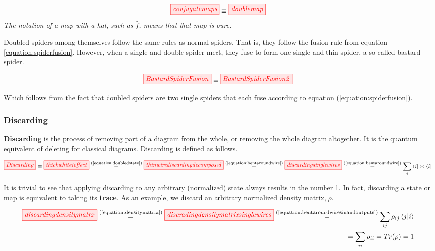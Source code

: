 \documentclass[]{article}
\newcommand{\equaltext}[1]{\ensuremath{\stackrel{\text{#1}}{=}}}
\begin{document}
\begin{equation}
\label{equation:conjugatemaps}
\tikzfig{conjugatemaps} \equiv \tikzfig{doublemap}
\end{equation}
\textit{The notation of a map with a hat, such as $\hat{f}$, means that that map is pure.}

Doubled spiders among themselves follow the same rules as normal spiders. That is, they follow the fusion rule from equation \ref{equation:spiderfusion}. However, when a single and double spider meet, they fuse to form one single and thin spider, a so called bastard spider.

\begin{equation}
\label{equation:bastardspiderfusion}
	\tikzfig{BastardSpiderFusion} = \tikzfig{BastardSpiderFusion2}
\end{equation}

Which follows from the fact that doubled spiders are two single spiders that each fuse according to equation (\ref{equation:spiderfusion}).
\subsubsection{Discarding}
\label{discarding}

\textbf{Discarding} is the process of removing part of a diagram from the whole, or removing the whole diagram altogether. It is the quantum equivalent of deleting for classical diagrams. Discarding is defined as follows.

\begin{equation}
\label{equation:discarding}
\tikzfig{Discarding} \equiv \tikzfig{thickwhiteieffect} \equaltext{(\ref{equation:doubledstate})} \tikzfig{thinwirediscardingdecomposed} 
\equaltext{(\ref{equation:bentaroundwire})}
 \tikzfig{discardingsinglewires} \equaltext{(\ref{equation:bentaroundwire})} \sum\limits_{i}\bra{i}\otimes\bra{i}
\end{equation}

It is trivial to see that applying discarding to any arbitrary (normalized) state always results in the number 1. In fact, discarding a state or map is equivalent to taking its \textbf{trace}. As an example, we discard an arbitrary normalized density matrix, $\rho$.

\begin{equation}
\label{equation:discardingstate}
\begin{split}
\tikzfig{discardingdensitymatrx} \equaltext{(\ref{equation:densitymatrix})} \tikzfig{discradingdensitymatrixsinglewires} \equaltext{(\ref{equation:bentaroundwiresinandoutputs})} \sum\limits_{ij} \rho_{ij} \bra{j}\ket{i} \\ = \sum\limits_{ii} \rho_{ii} = Tr(\rho) = 1
\end{split}
\end{equation}
\end{document}
